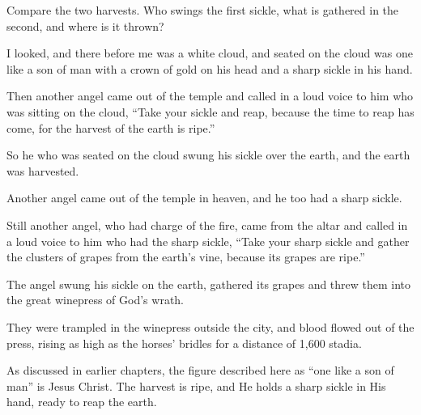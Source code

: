 \begin{ScriptureBox2}{Compare the two harvests. Who swings the first sickle, what is gathered in the second, and where is it thrown?}

\item[14:14] I looked, and there before me was a white cloud, and seated on the cloud was one like a son of man with a crown of gold on his head and a sharp sickle in his hand.

\item[14:15] Then another angel came out of the temple and called in a loud voice to him who was sitting on the cloud, ``Take your sickle and reap, because the time to reap has come, for the harvest of the earth is ripe.''

\item[14:16] So he who was seated on the cloud swung his sickle over the earth, and the earth was harvested.

\item[14:17] Another angel came out of the temple in heaven, and he too had a sharp sickle.

\item[14:18] Still another angel, who had charge of the fire, came from the altar and called in a loud voice to him who had the sharp sickle, ``Take your sharp sickle and gather the clusters of grapes from the earth's vine, because its grapes are ripe.''

\item[14:19] The angel swung his sickle on the earth, gathered its grapes and threw them into the great winepress of God's wrath.

\item[14:20] They were trampled in the winepress outside the city, and blood flowed out of the press, rising as high as the horses' bridles for a distance of 1,600 stadia.

\end{ScriptureBox2}

As discussed in earlier chapters, the figure described here as “one like a son of man” is Jesus Christ. The harvest is ripe, and He holds a sharp sickle in His hand, ready to reap the earth.


